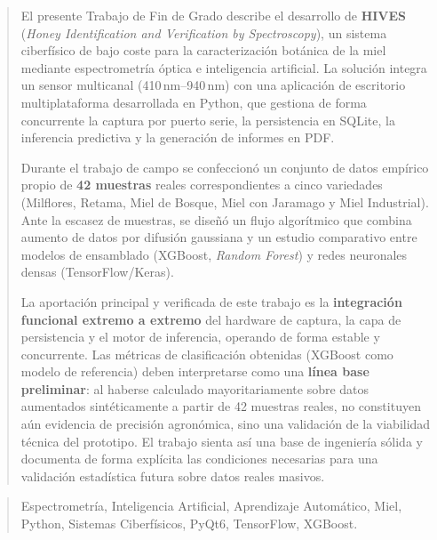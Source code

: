 \documentclass[a4paper,12pt,twoside]{memoir}
\begin{document}
\frontmatter

\renewcommand*\abstractname{Resumen}
\begin{abstract}
El presente Trabajo de Fin de Grado describe el desarrollo de
\textbf{HIVES} (\textit{Honey Identification and Verification by Spectroscopy}),
un sistema ciberfísico de bajo coste para la caracterización botánica de la miel
mediante espectrometría óptica e inteligencia artificial. La solución integra un
sensor multicanal (410\,nm--940\,nm) con una aplicación de escritorio multiplataforma
desarrollada en Python, que gestiona de forma concurrente la captura por puerto serie,
la persistencia en SQLite, la inferencia predictiva y la generación de informes en PDF.

Durante el trabajo de campo se confeccionó un conjunto de datos empírico propio de
\textbf{42 muestras} reales correspondientes a cinco variedades (Milflores, Retama,
Miel de Bosque, Miel con Jaramago y Miel Industrial). Ante la escasez de muestras,
se diseñó un flujo algorítmico que combina aumento de datos por difusión gaussiana
y un estudio comparativo entre modelos de ensamblado (XGBoost, \textit{Random Forest})
y redes neuronales densas (TensorFlow/Keras).

La aportación principal y verificada de este trabajo es la \textbf{integración
funcional extremo a extremo} del hardware de captura, la capa de persistencia y el
motor de inferencia, operando de forma estable y concurrente. Las métricas de
clasificación obtenidas (XGBoost como modelo de referencia) deben interpretarse como
una \textbf{línea base preliminar}: al haberse calculado mayoritariamente sobre datos
aumentados sintéticamente a partir de 42 muestras reales, no constituyen aún evidencia
de precisión agronómica, sino una validación de la viabilidad técnica del prototipo.
El trabajo sienta así una base de ingeniería sólida y documenta de forma explícita las
condiciones necesarias para una validación estadística futura sobre datos reales
masivos.
\end{abstract}

\renewcommand*\abstractname{Descriptores}
\begin{abstract}
Espectrometría, Inteligencia Artificial, Aprendizaje Automático, Miel, Python, Sistemas Ciberfísicos, PyQt6, TensorFlow, XGBoost.
\end{abstract}
\end{document}
